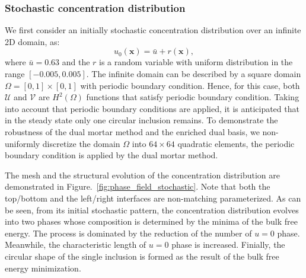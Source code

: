 \subsubsection{Stochastic concentration distribution}

We first consider an initially stochastic concentration distribution over an infinite 2D domain, as:
\begin{equation}
	u_0(\mathbf{x}) = \bar{u}+r(\mathbf{x}),
\end{equation}
where $\bar{u}=0.63$ and the $r$ is a random variable with uniform distribution in the range $\left[ -0.005, 0.005 \right]$. The infinite domain can be described by a square domain $\Omega=\left[0 , 1\right] \times \left[0 , 1\right]$ with periodic boundary condition. Hence, for this case, both $\mathcal{U}$ and $\mathcal{V}$ are $H^2(\Omega)$ functions that satisfy periodic boundary condition. Taking into account that periodic boundary conditions are applied, it is anticipated that in the steady state only one circular inclusion remains. To demonstrate the robustness of the dual mortar method and the enriched dual basis, we non-uniformly discretize the domain $\Omega$ into $64 \times 64$ quadratic elements, the periodic boundary condition is applied by the dual mortar method.\par

The mesh and the structural evolution of the concentration distribution are demonstrated in Figure.~\ref{fig:phase_field_stochastic}. Note that both the top/bottom and the left/right interfaces are non-matching parameterized. As can be seen, from its initial stochastic pattern, the concentration distribution evolves into two phases whose composition is determined by the minima of the bulk free energy. The process is dominated by the reduction of the number of $u=0$ phase. Meanwhile, the characteristic length of $u=0$ phase is increased. Finially, the circular shape of the single inclusion is formed as the result of the bulk free energy minimization.

